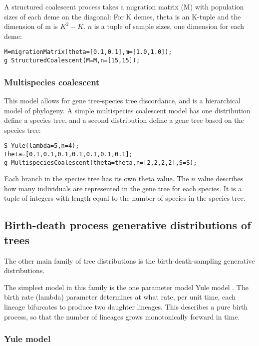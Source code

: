 \documentclass[10pt,letterpaper,table]{article}
\begin{document}
A structured coalescent process takes a migration matrix (M) with
population sizes of each deme on the diagonal:
For K demes, theta is an K-tuple and the dimension of m is $K^2 -
K$. $n$ is a tuple of sample sizes, one dimension for each deme:

\begin{alltt}
  M = migrationMatrix(theta=[0.1, 0.1], m=[1.0, 1.0]);
  g ~ StructuredCoalescent(M=M, n=[15, 15]);
\end{alltt}

\subsubsection*{Multispecies coalescent}

This model allows for gene tree-species tree discordance, and is a
hierarchical model of phylogeny.
A simple multispecies coalescent model has one distribution define a
species tree, and a second distribution define a gene tree based on
the species tree:

\begin{alltt}
  S ~ Yule(lambda=5, n=4);
  theta = [0.1, 0.1, 0.1, 0.1, 0.1, 0.1, 0.1];
  g ~ MultispeciesCoalescent(theta=theta, n=[2, 2, 2, 2], S=S);
\end{alltt}

Each branch in the species tree has its own theta value.
The $n$ value describes how many individuals are represented in
the gene tree for each species.
It is a tuple of integers with length equal to the number of species
in the species tree.

\subsection*{Birth-death process generative distributions of trees}

The other main family of tree distributions is the birth-death-sampling generative distributions.

The simplest model in this family is the one parameter model Yule model \cite{yule1925ii}.
The birth rate (lambda) parameter determines at what rate, per unit time, each lineage bifurcates to produce two daughter lineages.
This describes a pure birth process, so that the number of lineages grows monotonically forward in time.

\subsubsection*{Yule model}
\end{document}
